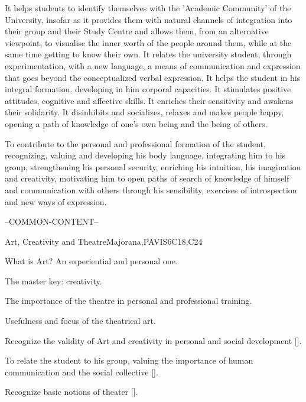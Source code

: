 \begin{syllabus}


\begin{justification}
	It helps students to identify themselves with the 'Academic Community' of the University, insofar as it provides them with natural channels of integration into their group and their Study Centre and allows them, from an alternative viewpoint, to visualise the inner worth of the people around them, while at the same time getting to know their own.
	It relates the university student, through experimentation, with a new language, a means of communication and expression that goes beyond the conceptualized verbal expression.
	It helps the student in his integral formation, developing in him corporal capacities. It stimulates positive attitudes, cognitive and affective skills. It enriches their sensitivity and awakens their solidarity.
	It disinhibits and socializes, relaxes and makes people happy, opening a path of knowledge of one's own being and the being of others.
\end{justification}

\begin{goals}
\item To contribute to the personal and professional formation of the student, recognizing, valuing and developing his body language, integrating him to his group, strengthening his personal security, enriching his intuition, his imagination and creativity, motivating him to open paths of search of knowledge of himself and communication with others through his sensibility, exercises of introspection and new ways of expression.
\end{goals}

--COMMON-CONTENT--

\begin{unit}{}{Art, Creativity and Theatre}{Majorana,PAVIS}{6}{C18,C24}
\begin{topics}
	\item What is Art? An experiential and personal one.
	\item The master key: creativity.
	\item The importance of the theatre in personal and professional training.
	\item Usefulness and focus of the theatrical art.
\end{topics}
\begin{learningoutcomes}
	\item Recognize the validity of Art and creativity in personal and social development [\Usage].
	\item To relate the student to his group, valuing the importance of human communication and the social collective [\Usage].
	\item Recognize basic notions of theater [\Usage].
\end{learningoutcomes}
\end{unit}


\end{syllabus}
